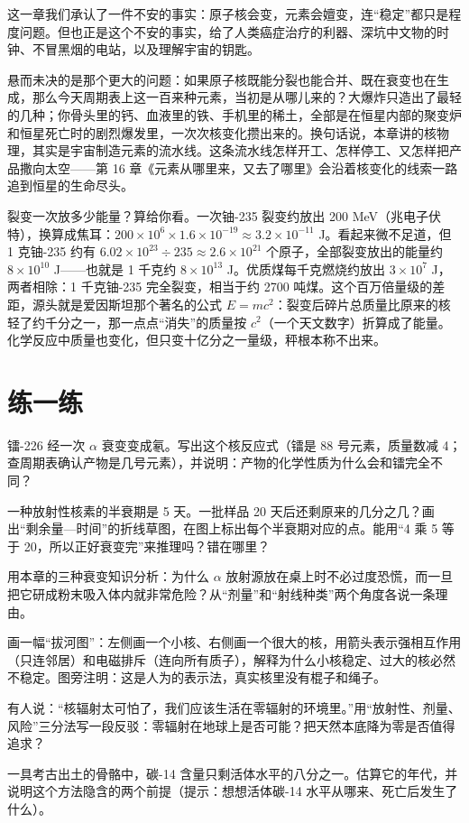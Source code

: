 这一章我们承认了一件不安的事实：原子核会变，元素会嬗变，连“稳定”都只是程度问题。但也正是这个不安的事实，给了人类癌症治疗的利器、深坑中文物的时钟、不冒黑烟的电站，以及理解宇宙的钥匙。

悬而未决的是那个更大的问题：如果原子核既能分裂也能合并、既在衰变也在生成，那么今天周期表上这一百来种元素，当初是从哪儿来的？大爆炸只造出了最轻的几种；你骨头里的钙、血液里的铁、手机里的稀土，全部是在恒星内部的聚变炉和恒星死亡时的剧烈爆发里，一次次核变化攒出来的。换句话说，本章讲的核物理，其实是宇宙制造元素的流水线。这条流水线怎样开工、怎样停工、又怎样把产品撒向太空——第 16 章《元素从哪里来，又去了哪里》会沿着核变化的线索一路追到恒星的生命尽头。

\begin{tiaozhan}
裂变一次放多少能量？算给你看。一次铀-235 裂变约放出 200 MeV（兆电子伏特），换算成焦耳：$200\times 10^{6}\times 1.6\times 10^{-19}\approx 3.2\times 10^{-11}$ J。看起来微不足道，但 1 克铀-235 约有 $6.02\times 10^{23}\div 235\approx 2.6\times 10^{21}$ 个原子，全部裂变放出的能量约 $8\times 10^{10}$ J——也就是 1 千克约 $8\times 10^{13}$ J。优质煤每千克燃烧约放出 $3\times 10^{7}$ J，两者相除：1 千克铀-235 完全裂变，相当于约 2700 吨煤。这个百万倍量级的差距，源头就是爱因斯坦那个著名的公式 $E=mc^{2}$：裂变后碎片总质量比原来的核轻了约千分之一，那一点点“消失”的质量按 $c^2$（一个天文数字）折算成了能量。化学反应中质量也变化，但只变十亿分之一量级，秤根本称不出来。
\end{tiaozhan}

\section*{练一练}

\begin{sikaoti}
\item 镭-226 经一次 $\alpha$ 衰变变成氡。写出这个核反应式（镭是 88 号元素，质量数减 4；查周期表确认产物是几号元素），并说明：产物的化学性质为什么会和镭完全不同？
\item 一种放射性核素的半衰期是 5 天。一批样品 20 天后还剩原来的几分之几？画出“剩余量—时间”的折线草图，在图上标出每个半衰期对应的点。能用“4 乘 5 等于 20，所以正好衰变完”来推理吗？错在哪里？
\item 用本章的三种衰变知识分析：为什么 $\alpha$ 放射源放在桌上时不必过度恐慌，而一旦把它研成粉末吸入体内就非常危险？从“剂量”和“射线种类”两个角度各说一条理由。
\item 画一幅“拔河图”：左侧画一个小核、右侧画一个很大的核，用箭头表示强相互作用（只连邻居）和电磁排斥（连向所有质子），解释为什么小核稳定、过大的核必然不稳定。图旁注明：这是人为的表示法，真实核里没有棍子和绳子。
\item 有人说：“核辐射太可怕了，我们应该生活在零辐射的环境里。”用“放射性、剂量、风险”三分法写一段反驳：零辐射在地球上是否可能？把天然本底降为零是否值得追求？
\item 一具考古出土的骨骼中，碳-14 含量只剩活体水平的八分之一。估算它的年代，并说明这个方法隐含的两个前提（提示：想想活体碳-14 水平从哪来、死亡后发生了什么）。
\end{sikaoti}

